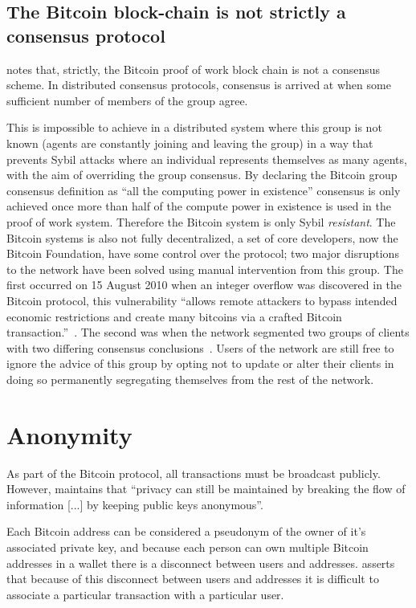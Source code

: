 \subsection{The Bitcoin block-chain is not strictly a consensus protocol}
\textcite{bitcoin-impossible} notes that, strictly, the Bitcoin proof of work block chain is not a consensus scheme. In distributed consensus protocols, consensus is arrived at when some sufficient number of members of the group agree.

This is impossible to achieve in a distributed system where this group is not known (agents are constantly joining and leaving the group) in a way that prevents Sybil attacks\cite{sybil} where an individual represents themselves as many agents, with the aim of overriding the group consensus.  By declaring the Bitcoin group consensus definition as ``all the computing power in existence'' consensus is only achieved once more than half of the compute power in existence is used in the proof of work system. Therefore the Bitcoin system is only Sybil \emph{resistant}. The Bitcoin systems is also not fully decentralized, a set of core developers, now the Bitcoin Foundation, have some control over the protocol; two major disruptions to the network have been solved using manual intervention from this group.  The first occurred on 15 August 2010 when an integer overflow was discovered in the Bitcoin protocol, this vulnerability ``allows remote attackers to bypass intended economic restrictions and create many bitcoins via a crafted Bitcoin transaction.''~\cite{CVE-2010-5139}. The second was when the network segmented two groups of clients with two differing consensus conclusions~\cite{CVE-2013-3220,glitch-report,major-glitch}.  Users of the network are still free to ignore the advice of this group by opting not to update or alter their clients in doing so permanently segregating themselves from the rest of the network.

\section{Anonymity}
As part of the Bitcoin protocol, all transactions must be broadcast publicly.  However, \textcite{satoshi} maintains that ``privacy can still be maintained by breaking the flow of information [...] by keeping public keys anonymous''.

Each Bitcoin address can be considered a pseudonym of the owner of it's associated private key, and because each person can own multiple Bitcoin addresses in a wallet there is a disconnect between users and addresses. \textcite{satoshi} asserts that because of this disconnect between users and addresses it is difficult to associate a particular transaction with a particular user.

